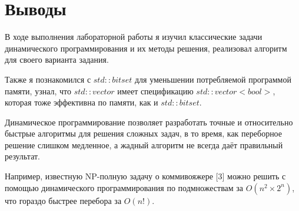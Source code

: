 \section{Выводы}

В ходе выполнения лабораторной работы я изучил классические задачи динамического программирования и их методы решения, реализовал алгоритм для своего
варианта задания.

Также я познакомился с $std::bitset$ для уменьшении потребляемой программой памяти, узнал, что $std::vector$ имеет спецификацию $std::vector<bool>$, которая тоже эффективна по памяти, как и $std::bitset$.

Динамическое программирование позволяет разработать точные и относительно быстрые алгоритмы для решения сложных задач, в то время, как переборное решение
слишком медленное, а жадный алгоритм не всегда даёт правильный результат.

Например, известную NP-полную задачу о коммивояжере [3] можно решить с помощью динамического программирования по подмножествам за $O(n^2 \times 2^n)$, что гораздо
быстрее перебора за $O(n!)$.

\pagebreak
